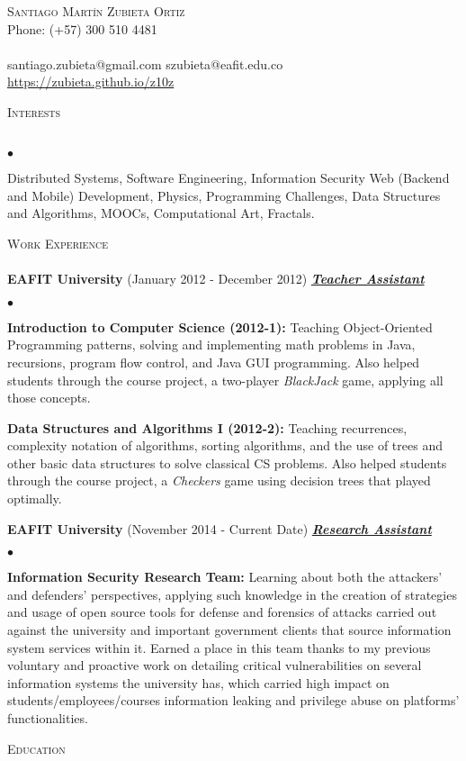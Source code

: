 \documentclass{article}
\newcommand{\lineunder}{\vspace*{-8pt} \\ \hspace*{-18pt} \hrulefill \\}
\newcommand{\header}[1]{{\hspace*{-15pt}\vspace*{6pt}
    \textsc{#1}} \vspace*{-6pt} \lineunder}
\newcommand{\employer}[3]{{
    \textbf{#1} (#2) \underline{\textbf{\emph{#3}}} }}
\newcommand{\contact}[4]{
  \vspace*{-8pt}
  \begin{center}
    {\LARGE \scshape {#1}}\\ #2 \lineunder #3 \\ #4
  \end{center}
  \vspace*{-8pt} }
\newenvironment{achievements}{\begin{list}{$\bullet$}{\topsep 2pt \itemsep
      -2pt}}{\vspace*{5pt}\end{list}}
\begin{document}
\small
\smallskip
\vspace*{-44pt}

\contact{Santiago Mart\'in Zubieta Ortiz} { Phone: (+57) 300 510 4481} { santiago.zubieta@gmail.com szubieta@eafit.edu.co} {\url{https://zubieta.github.io/z10z}} 
\bigskip
\header{Interests}
\vspace*{-14pt}
\begin{achievements}
\item Distributed Systems, Software Engineering, Information Security Web (Backend and Mobile) Development, Physics, Programming Challenges, Data Structures and Algorithms, MOOCs, Computational Art, Fractals.
\end{achievements}
\header{Work Experience}
\employer{EAFIT University}{January 2012 - December 2012}{Teacher Assistant}
\begin{achievements}
\item \textbf{Introduction to Computer Science (2012-1):} Teaching Object-Oriented Programming patterns, solving and implementing math problems in Java, recursions, program flow control, and Java GUI programming. Also helped students through the course project, a two-player \textit{BlackJack} game, applying all those concepts.
\item \textbf{Data Structures and Algorithms I (2012-2):} Teaching recurrences, complexity notation of algorithms, sorting algorithms, and the use of trees and other basic data structures to solve classical CS problems. Also helped students through the course project, a \textit{Checkers} game using decision trees that played optimally.
\end{achievements}
\employer{EAFIT University}{November 2014 - Current Date}{Research Assistant}
\begin{achievements}
\item \textbf{Information Security Research Team:} Learning about both the attackers' and defenders' perspectives, applying such knowledge in the creation of strategies and usage of open source tools for defense and forensics of attacks carried out against the university and important government clients that source information system services within it. Earned a place in this team thanks to my previous voluntary and proactive work on detailing critical vulnerabilities on several information systems the university has, which carried high impact on students/employees/courses information leaking and privilege abuse on platforms' functionalities.
\end{achievements}
\header{Education}
\end{document}
